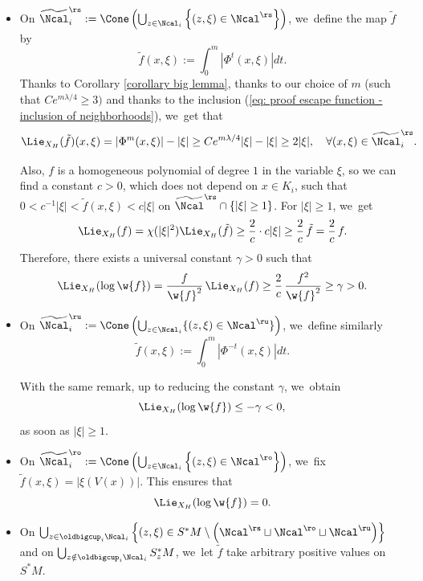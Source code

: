 \begin{itemize}
\item On $\widetilde{\Ncal}_i^\rs:= \Cone \left(\bigcup_{z \in \Ncal_i} \left\{(z,\xi) \in \Ncal^\rs \right\}\right)$, we~define the map $\tilde{f}$ by
\[
\widetilde{f} (x,\xi):= \int_0^m |\Phi^t (x,\xi)| dt.
\]
Thanks to Corollary \ref{corollary big lemma}, thanks to our choice of $m$ (such that $C e^{m \lambda /4} \geq 3)$ and thanks to the inclusion (\ref{eq: proof escape function - inclusion of neighborhoods}), we~get that
\[
\Lie_{X_H} (\tilde{f})(x,\xi) = |\Phi^m (x,\xi)| - |\xi| \geq Ce^{m\lambda/4} |\xi| - |\xi| \geq 2 |\xi|, \quad \forall (x,\xi) \in \widetilde{\Ncal}_i^\rs.
\]

Also, $f$ is a homogeneous polynomial of degree $1$ in the variable $\xi$, so we can find a constant $c > 0$, which does not depend on $x \in K_i$, such that $0 < c^{-1} |\xi| < \widetilde{f} (x,\xi) < c |\xi|$ on $\widetilde{\Ncal}^\rs \cap \{|\xi| \geq 1\}$. For $|\xi| \geq 1$, we~get
\[
\Lie_{X_H} (f) = \chi (|\xi|^2) \Lie_{X_H} (\tilde{f}) \geq \frac{2}{c}\cdot c|\xi| \geq \frac{2}{c}\, \tilde{f} = \frac{2}{c}\, f.
\]
Therefore, there exists a universal constant $\gamma > 0$ such that
\begin{equation}\label{eq: proof escape function - estimate 1 on f}
\Lie_{X_H} (\log \w{f}) = \frac{f}{\w{f}^2}\, \Lie_{X_H} (f) \geq \frac{2}{c}\, \frac{f^2}{\w{f}^2} \geq \gamma > 0.
\end{equation}
\item On $\widetilde{\Ncal}_i^\ru:= \Cone \left(\bigcup_{z \in \Ncal_i} \{(z,\xi) \in \Ncal^\ru \} \right)$, we~define similarly
\[
\tilde{f}(x,\xi):= \int_0^m |\Phi^{-t} (x,\xi)| dt.
\]

With the same remark, up to reducing the constant $\gamma$, we~obtain
\begin{equation}\label{eq: proof escape function - estimate 2 on f}
\Lie_{X_H} (\log \w{f}) \leq -\gamma < 0,
\end{equation}
as soon as $|\xi| \geq 1$.
\item On $\widetilde{\Ncal}_i^\ro:= \Cone \left(\bigcup_{z \in \Ncal_i} \left\{ (z,\xi) \in \Ncal^\ro \right\} \right)$, we~fix $\tilde{f} (x,\xi) = |\xi (V (x))|$. This ensures that
\[
\Lie_{X_H} (\log \w{f}) = 0.
\]
\item On $ \bigcup_{z \in \oldbigcup_i \Ncal_i} \left\{ (z,\xi) \in S^* M \setminus \left(\Ncal^\rs \sqcup \Ncal^\ro \sqcup \Ncal^\ru \right) \right\}$ and on $\bigcup_{z \notin \oldbigcup_{i} \Ncal_i} S_z^* M$, we~let $\tilde{f}$ take arbitrary positive values on $S^*M$.
\end{itemize}

